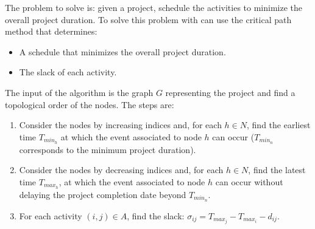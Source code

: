 \documentclass[12pt, a4paper]{report}
\newtheorem[style=M,bodystyle=\normalfont]{proposition}{Proposition}
\newtheorem[style=M,bodystyle=\normalfont]{theorem}{Theorem}
\newtheorem[style=M,bodystyle=\normalfont]{corollary}{Corollary}
\newtheorem[style=M,bodystyle=\normalfont]{lemma}{Lemma}
\newtheorem[style=M,bodystyle=\normalfont]{definition}{Definition}
\begin{document}
    The problem to solve is: given a project, schedule the activities to minimize the overall project duration. To solve this problem with can use the critical path method that
    determines: 
    \begin{itemize}
        \item A schedule that minimizes the overall project duration. 
        \item The slack of each activity. 
    \end{itemize}
    The input of the algorithm is the graph $G$ representing the project and find a topological order of the nodes. The steps are: 
    \begin{enumerate}
        \item Consider the nodes by increasing indices and, for each $h \in N$, find the earliest time $T_{min_h}$ at which the event associated to node $h$ can occur
            ($T_{min_n}$ corresponds to the minimum project duration). 
        \item Consider the nodes by decreasing indices and, for each $h \in N$, find the latest time $T_{max_h}$, at which the event associated to node $h$ can occur
            without delaying the project completion date beyond $T_{min_n}$. 
        \item For each activity $(i,j) \in A$, find the slack: $\sigma_{ij}=T_{max_j}-T_{max_i}-d_{ij}$. 
    \end{enumerate}
\end{document}
